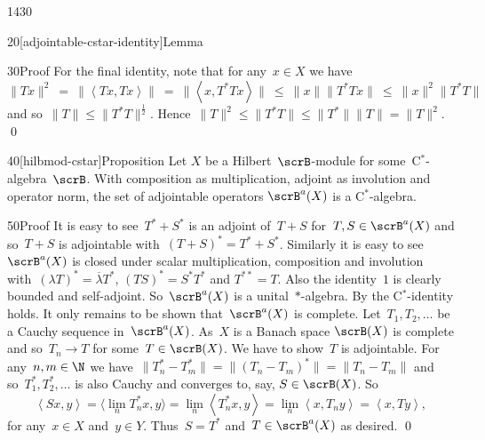 \begin{parsec}{1430}
\begin{point}{20}[adjointable-cstar-identity]{Lemma}
\begin{point}{30}{Proof}
For the final identity, note that for any~$x \in X$ we have
\begin{equation*}
\|Tx\|^2 \ =\  \|\left<Tx,Tx\right>\| 
            \ =\  \| \left<x, T^*Tx\right>\|
            \ \leq\  \|x \| \|T^*Tx \|
            \ \leq\  \|x\|^2 \|T^*T\|
\end{equation*}
and so~$\|T\| \leq \|T^*T\|^{\frac{1}{2}}$.
Hence~$\|T\|^2 \leq \|T^*T\| \leq \|T^*\|\|T\| = \|T\|^2$.
    \qed
\end{point}
\end{point}
\begin{point}{40}[hilbmod-cstar]{Proposition}%
Let $X$ be a Hilbert~$\scrB$-module for some~C$^*$-algebra~$\scrB$.
With composition as multiplication,
    adjoint as involution
    and operator norm,
    the set of adjointable operators
     $\scrB^a(X)$ is a C$^*$-algebra. \cite[\S2]{paschke}
\begin{point}{50}{Proof}
It is easy to see~$T^*+S^*$ is an adjoint of~$T+S$
    for~$T,S \in \scrB^a(X)$
    and so~$T+S$ is adjointable with~$(T+S)^* = T^*+ S^*$.
    Similarly it is easy to see~$\scrB^a(X)$
        is closed under scalar multiplication, composition and involution
        with~$(\lambda T)^* = \overline{\lambda} T^* $,
            $(TS)^* = S^*T^*$ and
            $T^{**} =T$.
Also the identity~$1$ is clearly bounded and self-adjoint.
So~$\scrB^a(X)$ is a unital~$*$-algebra.
By  
    the C$^*$-identity holds.
It only remains to be shown that~$\scrB^a(X)$ is complete.
Let~$T_1,T_2,\ldots$ be a Cauchy sequence in~$\scrB^a(X)$.
As~$X$ is a Banach space $\scrB(X)$ is complete
    and so~$T_n \to T$ for some~$T \in \scrB(X)$.
We have to show~$T$ is adjointable.
For any~$n,m \in \N$ we have~$\|T_n^* - T_m^*\|
= \|(T_n - T_m)^*\| = \|T_n - T_m\|$
and so~$T^*_1, T^*_2,\ldots$
is also Cauchy
and converges to, say, $S \in \scrB(X)$.
So
\begin{equation*}
\left<S x, y\right> =
\langle\lim_{n} T^*_n x, y\rangle = \lim_n \left<T_n^* x, y\right>
                = \lim_n \left<x, T_n y\right>
                =  \left<x, T y\right>,
\end{equation*}
for any~$x \in X$ and~$y \in Y$.
Thus~$S = T^*$ and~$T \in \scrB^a(X)$ as desired. \qed
\end{point}
\end{point}
\end{parsec}
